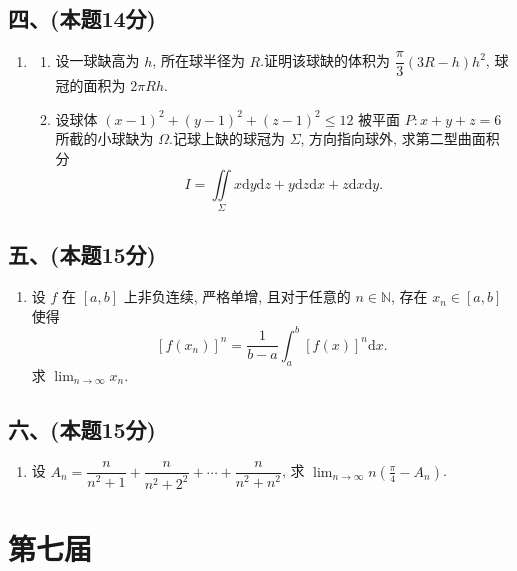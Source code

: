 \subsection*{四、(本题14分)}
\begin{enumerate}[start=8]
    \item
          \begin{enumerate}
              \item [(1)] 设一球缺高为 $h$,  所在球半径为 $R$.证明该球缺的体积为 $\dfrac{\pi}{3}(3R-h)h^2$,  球冠的面积为 $2\pi Rh$.
              \item [(2)] 设球体 $(x-1)^2 + (y-1)^2 + (z-1)^2 \leqslant 12$ 被平面 $P: x + y + z = 6$ 所截的小球缺为 $\Omega$.记球上缺的球冠为 $\Sigma$,  方向指向球外,  求第二型曲面积分
                    \[
                        I = \iint\limits_{\Sigma} x  \mathrm{d}y  \mathrm{d}z + y  \mathrm{d}z  \mathrm{d}x + z  \mathrm{d}x  \mathrm{d}y.
                    \]
          \end{enumerate}
\end{enumerate}

\subsection*{五、(本题15分)}
\begin{enumerate}[start=9]
    \item 设 $f$ 在 $[a, b]$ 上非负连续,  严格单增,  且对于任意的 $n \in \mathbb{N}$,  存在 $x_n \in [a, b]$ 使得
          \[
              [f(x_n)]^n = \frac{1}{b-a} \int_a^b [f(x)]^n  \mathrm{d}x.
          \]
          求 $\displaystyle\lim_{n \to \infty} x_n$.
\end{enumerate}

\subsection*{六、(本题15分)}
\begin{enumerate}[start=10]
    \item 设 $A_n = \dfrac{n}{n^2 + 1} + \dfrac{n}{n^2 + 2^2} + \cdots + \dfrac{n}{n^2 + n^2}$,  求 $\displaystyle\lim_{n \to \infty} n \left( \frac{\pi}{4} - A_n \right)$.
\end{enumerate}


\newpage
\section{第七届}

